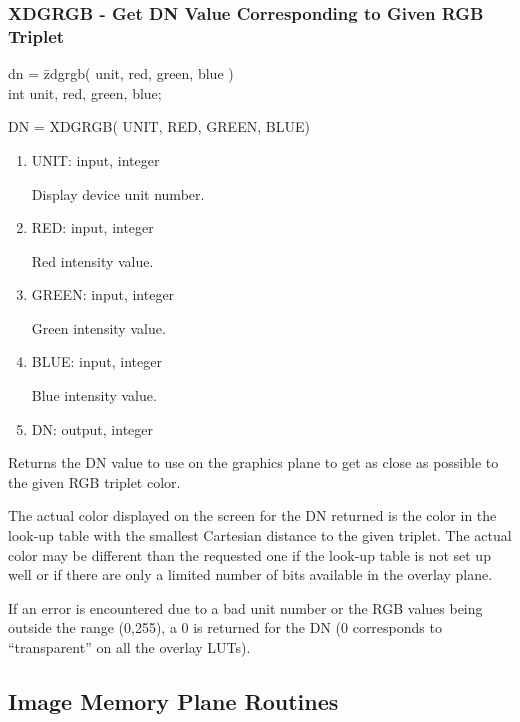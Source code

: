 \subsubsection{XDGRGB - Get DN Value Corresponding to Given RGB Triplet}
\begin{tabbing}
dn = \=zdgrgb( unit, red, green, blue )\\
\>int  unit, red, green, blue;\\
\end{tabbing}
DN = XDGRGB( UNIT, RED, GREEN, BLUE)
\begin{enumerate}
\item UNIT:  input, integer

Display device unit number.
\item RED:  input, integer

Red intensity value.
\item GREEN:  input, integer

Green intensity value.
\item BLUE:  input, integer

Blue intensity value.
\item DN:  output, integer
\end{enumerate}
Returns the DN value to use on the graphics plane to get as close as
possible to the given RGB triplet color.

The actual color displayed on the screen for the DN returned is the
color in the look-up table with the smallest Cartesian distance to
the given triplet.  The actual color may be different than the
requested one if the look-up table is not set up well or if there
are only a limited number of bits available in the overlay plane.

If an error is encountered due to a bad unit number or the RGB values
being outside the range (0,255), a 0 is returned for the DN (0
corresponds to ``transparent'' on all the overlay LUTs).
\newpage
\subsection{Image Memory Plane Routines}
